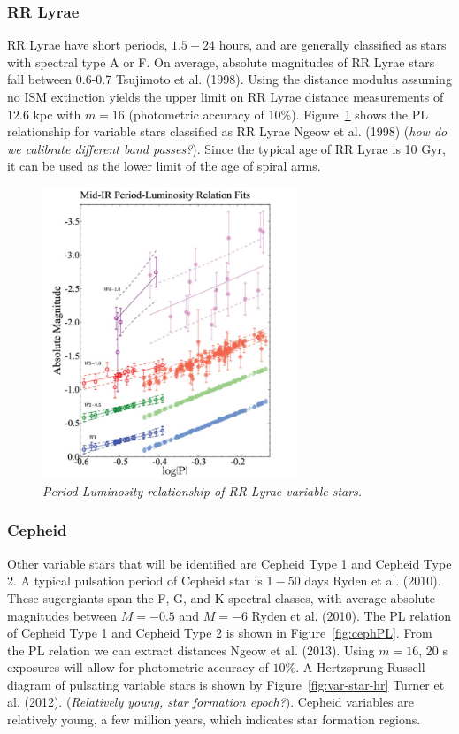 \documentclass[letterpaper,11pt]{article}
\begin{document}
\subsubsection{RR Lyrae}
RR Lyrae have short periods, $1.5 - 24$ hours, and are generally classified as stars with spectral type A or F.  On average, absolute magnitudes of RR Lyrae stars fall between 0.6-0.7 Tsujimoto et al. (1998). Using the distance modulus assuming no ISM extinction yields the upper limit on RR Lyrae distance measurements of $12.6$ kpc with $m=16$ (photometric accuracy of $10\%$). Figure~\ref{fig:plrelationrrlyrae} shows the PL relationship for variable stars classified as RR Lyrae Ngeow et al. (1998) (\textit{how do we calibrate different band passes?}). Since the typical age of RR Lyrae is 10 Gyr, it can be used as the lower limit of the age of spiral arms.

\begin{figure}[]%
  \begin{center}
\centerline{\includegraphics[width=3in]{figures/PL_relation}}
\caption{\it \small{Period-Luminosity relationship of RR Lyrae variable stars. \label{fig:plrelationrrlyrae}}}
  \end{center}
\end{figure}


\subsubsection{Cepheid}

Other variable stars that will be identified are Cepheid Type 1 and Cepheid Type 2.  A typical pulsation period of Cepheid star is $1 - 50$ days Ryden et al. (2010).  These sugergiants span the F, G, and K spectral classes, with average absolute magnitudes between $M=-0.5$ and $M=-6$ Ryden et al. (2010).  The PL relation of Cepheid Type 1 and Cepheid Type 2 is shown in Figure~\ref{fig:cephPL}. From the PL relation we can extract distances Ngeow et al. (2013). Using $m=16$, 20 s exposures will allow for photometric accuracy of $10\%$.  A Hertzsprung-Russell diagram of pulsating variable stars is shown by Figure~\ref{fig:var-star-hr} Turner et al. (2012). (\textit{Relatively young, star formation epoch?}). Cepheid variables are relatively young, a few million years, which indicates star formation regions.
\end{document}
